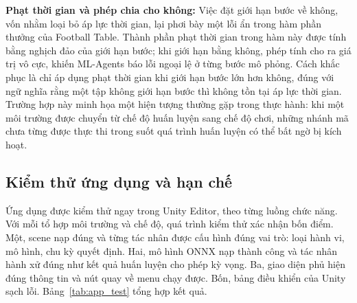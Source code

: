\indent \textbf{Phạt thời gian và phép chia cho không:} Việc đặt giới hạn bước về không, vốn nhằm loại bỏ áp lực thời gian, lại phơi bày một lỗi ẩn trong hàm phần thưởng của Football Table. Thành phần phạt thời gian trong hàm này được tính bằng nghịch đảo của giới hạn bước; khi giới hạn bằng không, phép tính cho ra giá trị vô cực, khiến ML-Agents báo lỗi ngoại lệ ở từng bước mô phỏng. Cách khắc phục là chỉ áp dụng phạt thời gian khi giới hạn bước lớn hơn không, đúng với ngữ nghĩa rằng một tập không giới hạn bước thì không tồn tại áp lực thời gian. Trường hợp này minh họa một hiện tượng thường gặp trong thực hành: khi một môi trường được chuyển từ chế độ huấn luyện sang chế độ chơi, những nhánh mã chưa từng được thực thi trong suốt quá trình huấn luyện có thể bất ngờ bị kích hoạt.

\subsection{Kiểm thử ứng dụng và hạn chế}
\label{sub:app-testing}

\indent Ứng dụng được kiểm thử ngay trong Unity Editor, theo từng luồng chức năng. Với mỗi tổ
hợp môi trường và chế độ, quá trình kiểm thử xác nhận bốn điểm. Một, scene nạp đúng và
từng tác nhân được cấu hình đúng vai trò: loại hành vi, mô hình, chu kỳ quyết định. Hai,
mô hình ONNX nạp thành công và tác nhân hành xử đúng như kết quả huấn luyện cho phép kỳ
vọng. Ba, giao diện phủ hiện đúng thông tin và nút quay về menu chạy được. Bốn, bảng điều
khiển của Unity sạch lỗi. Bảng~\ref{tab:app_test} tổng hợp kết quả.

